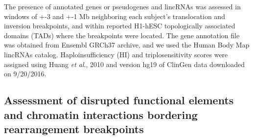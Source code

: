 \documentclass[a4paper,twoside=true,openright,parskip=full,chapterprefix=true,11pt,headings=normal,bibliography=totoc,listof=totoc,titlepage=on,captions=tableabove,draft=false]{scrreprt}
\theoremstyle{definition}
\theoremstyle{definition}
\theoremstyle{definition}
\theoremstyle{remark}
\begin{document}
The presence of annotated genes or pseudogenes and lincRNAs was assessed
in windows of +-3 and +-1 Mb neighboring each subject's translocation
and inversion breakpoints, and within reported H1-hESC topologically
associated domains (TADs)\citep{Dixon2012} where the breakpoints were
located. The gene annotation file was obtained from Ensembl GRCh37
archive,\citep{Flicek2014} and we used the Human Body Map lincRNAs
catalog.\citep{Cabili2011} Haploinsufficiency (HI) and triplosensitivity
scores were assigned using Huang \emph{et al}., 2010\citep{Huang2010}
and version hg19 of ClinGen\citep{Rehm2015} data downloaded on
9/20/2016.

\hypertarget{assessment-of-disrupted-functional-elements-and-chromatin-interactions-bordering-rearrangement-breakpoints}{%
\subsection{Assessment of disrupted functional elements and chromatin
interactions bordering rearrangement
breakpoints}\label{assessment-of-disrupted-functional-elements-and-chromatin-interactions-bordering-rearrangement-breakpoints}}
\end{document}
